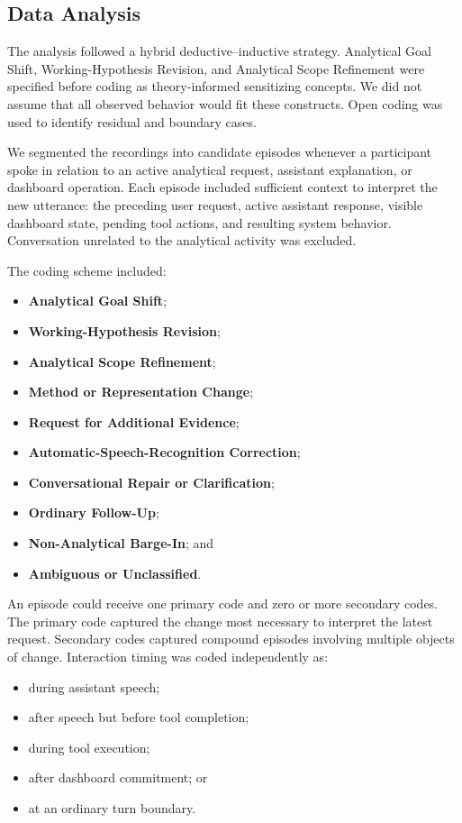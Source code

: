\documentclass[journal]{IEEEtran}
\begin{document}
\subsection{Data Analysis}
\label{sec:formative-analysis}

The analysis followed a hybrid deductive--inductive strategy. Analytical Goal
Shift, Working-Hypothesis Revision, and Analytical Scope Refinement were
specified before coding as theory-informed sensitizing concepts. We did not
assume that all observed behavior would fit these constructs. Open coding was
used to identify residual and boundary cases.

We segmented the recordings into candidate episodes whenever a participant
spoke in relation to an active analytical request, assistant explanation, or
dashboard operation. Each episode included sufficient context to interpret the
new utterance: the preceding user request, active assistant response, visible
dashboard state, pending tool actions, and resulting system behavior.
Conversation unrelated to the analytical activity was excluded.

The coding scheme included:

\begin{itemize}
\item \textbf{Analytical Goal Shift};
\item \textbf{Working-Hypothesis Revision};
\item \textbf{Analytical Scope Refinement};
\item \textbf{Method or Representation Change};
\item \textbf{Request for Additional Evidence};
\item \textbf{Automatic-Speech-Recognition Correction};
\item \textbf{Conversational Repair or Clarification};
\item \textbf{Ordinary Follow-Up};
\item \textbf{Non-Analytical Barge-In}; and
\item \textbf{Ambiguous or Unclassified}.
\end{itemize}

An episode could receive one primary code and zero or more secondary codes.
The primary code captured the change most necessary to interpret the latest
request. Secondary codes captured compound episodes involving multiple objects
of change. Interaction timing was coded independently as:

\begin{itemize}
\item during assistant speech;
\item after speech but before tool completion;
\item during tool execution;
\item after dashboard commitment; or
\item at an ordinary turn boundary.
\end{itemize}
\end{document}
